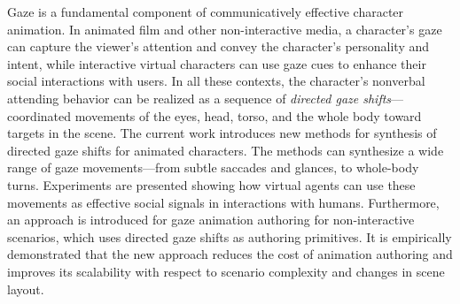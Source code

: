 Gaze is a fundamental component of communicatively effective character animation. In animated film and other non-interactive media, a character's gaze can capture the viewer's attention and convey the character's personality and intent, while interactive virtual characters can use gaze cues to enhance their social interactions with users. In all these contexts, the character's nonverbal attending behavior can be realized as a sequence of \emph{directed gaze shifts}---coordinated movements of the eyes, head, torso, and the whole body toward targets in the scene.
The current work introduces new methods for synthesis of directed gaze shifts for animated characters. The methods can synthesize a wide range of gaze movements---from subtle saccades and glances, to whole-body turns. Experiments are presented showing how virtual agents can use these movements as effective social signals in interactions with humans.
Furthermore, an approach is introduced for gaze animation authoring for non-interactive scenarios, which uses directed gaze shifts as authoring primitives. It is empirically demonstrated that the new approach reduces the cost of animation authoring and improves its scalability with respect to scenario complexity and changes in scene layout.
